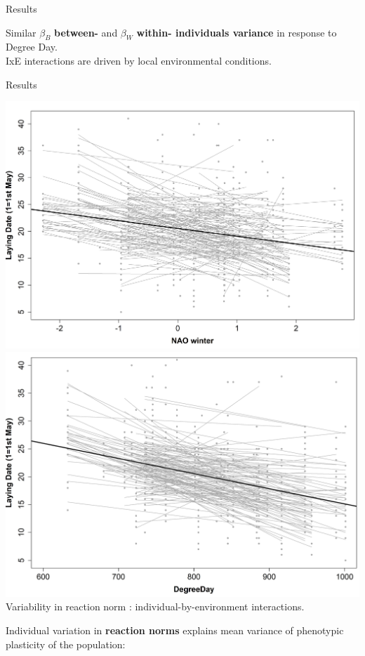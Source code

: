 \documentclass[compress]{beamer}
\begin{document}
\begin{frame}{Results}
\normalsize
\begin{flushleft} 
Similar $\beta_B$ \textbf{between-} and $\beta_W$ \textbf{within- individuals variance} in response to Degree Day.\\
IxE interactions are driven by local environmental conditions. \\

\end{flushleft}

\end{frame}

\begin{frame}{Results}

\centering
\includegraphics[height = 3.7 cm]{Chapter/RNNAO1.jpg}
\includegraphics[height = 3.7 cm]{Chapter/RNDD1.jpg}\\

\small
Variability in reaction norm : individual-by-environment interactions. \\

\vspace{0.5cm}
\raggedright
\normalsize
Individual variation in \textbf{reaction norms} explains mean variance of phenotypic plasticity of the population:



\end{frame}
\end{document}
